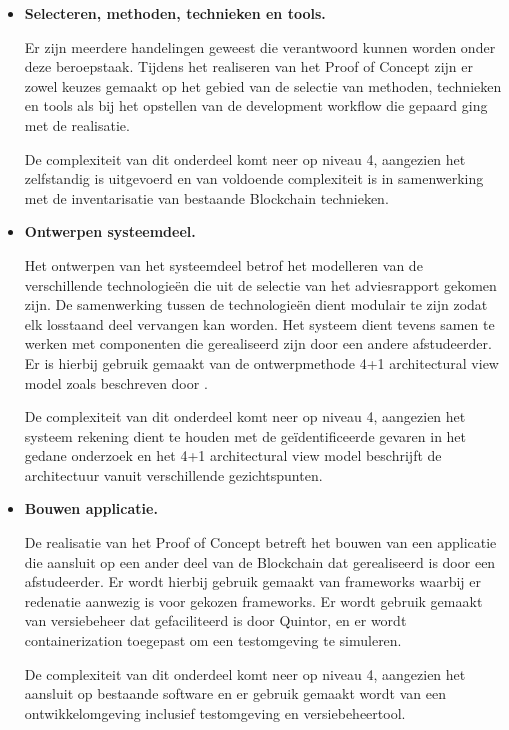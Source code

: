 \begin{itemize}
  \item \textbf{Selecteren, methoden, technieken en tools.}
  
  Er zijn meerdere handelingen geweest die verantwoord kunnen worden onder deze beroepstaak. Tijdens het realiseren van het Proof of Concept zijn er zowel keuzes gemaakt op het gebied van de selectie van methoden, technieken en tools als bij het opstellen van de development workflow die gepaard ging met de realisatie. 
  
  De complexiteit van dit onderdeel komt neer op niveau 4, aangezien het zelfstandig is uitgevoerd en van voldoende complexiteit is in samenwerking met de inventarisatie van bestaande Blockchain technieken.
  \item \textbf{Ontwerpen systeemdeel.}
  
  Het ontwerpen van het systeemdeel betrof het modelleren van de verschillende technologieën die uit de selectie van het adviesrapport gekomen zijn. De samenwerking tussen de technologieën dient modulair te zijn zodat elk losstaand deel vervangen kan worden. Het systeem dient tevens samen te werken met componenten die gerealiseerd zijn door een andere afstudeerder. Er is hierbij gebruik gemaakt van de ontwerpmethode 4+1 architectural view model zoals beschreven door \cite{kruchten19954+}. 
  
  De complexiteit van dit onderdeel komt neer op niveau 4, aangezien het systeem rekening dient te houden met de geïdentificeerde gevaren in het gedane onderzoek en het 4+1 architectural view model beschrijft de architectuur vanuit verschillende gezichtspunten.

  \item \textbf{Bouwen applicatie.}

  De realisatie van het Proof of Concept betreft het bouwen van een applicatie die aansluit op een ander deel van de Blockchain dat gerealiseerd is door een afstudeerder. Er wordt hierbij gebruik gemaakt van frameworks waarbij er redenatie aanwezig is voor gekozen frameworks. Er wordt gebruik gemaakt van versiebeheer dat gefaciliteerd is door Quintor, en er wordt containerization toegepast om een testomgeving te simuleren.

  De complexiteit van dit onderdeel komt neer op niveau 4, aangezien het aansluit op bestaande software en er gebruik gemaakt wordt van een ontwikkelomgeving inclusief testomgeving en versiebeheertool.

\end{itemize}




